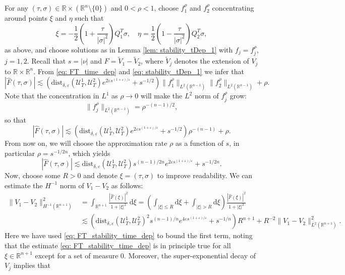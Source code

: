 \documentclass[10pt,a4paper]{amsart}
\theoremstyle{remark}
\theoremstyle{definition}
\newcommand{\R}{\mathbb{R}}
\newcommand{\dd}{\mathrm{d}}
\newcommand{\dist}{\mathrm{dist}}
\def\ve{\varepsilon}
\def\cal{\mathcal}
\def\wt{\widetilde}
\begin{document}
%
For any $(\tau,\sigma)\in \R\times\left(\R^n\setminus\{0\}\right)$ and $0<\rho<1$, choose $f_1^\rho$ and $f_2^\rho$ concentrating around points $\xi$ and $\eta$ such that \[
\xi=-\frac{1}{2}\left(1+\frac{\tau}{|\sigma|^2}\right)Q_1^T\sigma, \quad   \eta=\frac{1}{2}\left(1-\frac{\tau}{|\sigma|^2}\right)Q_2^T\sigma,
\] 
%
as above, and choose solutions as in Lemma \ref{lem: stability_tDep_1} with $f_j= f_j^\rho$, $j=1,2$. 
%
Recall that $s=|\nu|$ and $F=\wt{V}_1-\wt{V}_2$, where $\wt{V}_j$ denotes the extension of $V_j$ to $\R\times \R^n$. From \eqref{eq: FT_time_dep} and \eqref{eq: stability_tDep_1} we infer that
%
\[
	\left|\widehat F(\tau,\sigma)\right|\lesssim \left(\dist_{\delta,\ve}(\cal{U}_T^1, \cal{U}_T^2)e^{2\ve s^{(1+\ve)/\ve}}+s^{-1/2}\right)\|f^\rho_1\|_{L^2(\R^{n-1})} \|f^\rho_2\|_{L^2(\R^{n-1})} + \rho.
\]
%
Note that the concentration in $L^1$ as $\rho\to 0$ will make the $L^2$ norm of $f^\rho_j$ grow: 
%
\[
\|f_j^\rho\|_{L^2(\R^{n-1})}=\rho^{-(n-1)/2},
\]
%
so that
%
\[
	\left|\widehat F(\tau,\sigma)\right|\lesssim \left(\dist_{\delta,\ve}(\cal{U}_T^1, \cal{U}_T^2)e^{2\ve s^{(1+\ve)/\ve}}+s^{-1/2}\right)\rho^{-(n-1)} + \rho.
\]
%
From now on, we will choose the approximation rate $\rho$ as a function of $s$, in particular $\rho=s^{-1/2n}$, which yields
%
\begin{equation}\label{eq: FT_stability_time_dep}
	\left|\widehat F(\tau,\sigma)\right|\lesssim \dist_{\delta,\ve}(\cal{U}_T^1, \cal{U}_T^2)s^{(n-1)/2n}e^{2\ve s^{(1+\ve)/\ve}}+s^{-1/2n}.
\end{equation}
%
Now, choose some $R>0$ and denote $\xi=(\tau,\sigma)$ to improve readability. We can estimate the $H^{-1}$ norm of $V_1-V_2$ as follows:
%
\begin{equation}\label{eq: H_1_time_dep}
\begin{aligned}
	\|V_1-V_2\|^2_{H^{-1}(\R^{n+1})}&=\int_{\R^{n+1}}\frac{|\widehat F(\xi)|^2}{1+|\xi|^2}\,\dd \xi=\left(\int_{|\xi|\leq R}\dd \xi + \int_{|\xi|> R}\dd \xi \right) \frac{|\widehat F(\xi)|^2}{1+|\xi|^2} \\
	&\lesssim \left(\dist_{\delta,\ve}(\cal{U}_T^1, \cal{U}_T^2)^2 s^{(n-1)/n}e^{4\ve s^{(1+\ve)/\ve}}+s^{-1/n} \right) R^{n+1}+R^{-2}\|V_1-V_2\|^2_{L^2(\R^{n+1})}.
\end{aligned}
\end{equation}
%
Here we have used \eqref{eq: FT_stability_time_dep} to bound the first term, noting that the estimate \eqref{eq: FT_stability_time_dep} is in principle true for all $\xi\in\R^{n+1}$ except for a set of measure $0$. Moreover, the super-exponential decay of $V_j$ implies that 
\end{document}
